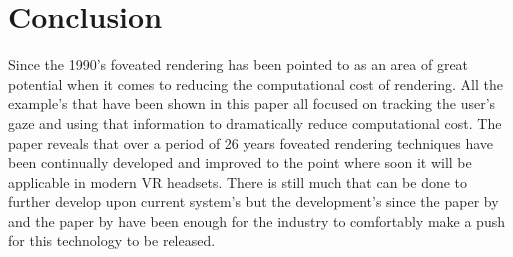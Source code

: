 \section{Conclusion}
Since the 1990's foveated rendering has been pointed to as an area of great potential when it comes to reducing the computational cost of rendering. All the example's that have been shown in this paper all focused on tracking the user's gaze and using that information to dramatically reduce computational cost. The paper reveals that over a period of 26 years foveated rendering techniques have been continually developed and improved to the point where soon it will be applicable in modern VR headsets. There is still much that can be done to further develop upon current system's but the development's since the paper by \cite{Levoy} and the paper by \cite{Patney} have been enough for the industry to comfortably make a push for this technology to be released.
